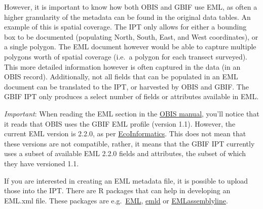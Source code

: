 \documentclass[
]{book}
\begin{document}
However, it is important to know how both OBIS and GBIF use EML, as often a higher granularity of the metadata can be found in the original data tables. An example of this is spatial coverage. The IPT only allows for either a bounding box to be documented (populating North, South, East, and West coordinates), or a single polygon. The EML document however would be able to capture multiple polygons worth of spatial coverage (i.e.~a polygon for each transect surveyed). This more detailed information however is often captured in the data (in an OBIS record). Additionally, not all fields that can be populated in an EML document can be translated to the IPT, or harvested by OBIS and GBIF. The GBIF IPT only produces a select number of fields or attributes available in EML.

\emph{Important}: When reading the EML section in the \href{https://obis.org/manual/eml/}{OBIS manual}, you'll notice that it reads that OBIS uses the GBIF EML profile (version 1.1). However, the current EML version is 2.2.0, as per \href{https://eml.ecoinformatics.org/}{EcoInformatics}. This does not mean that these versions are not compatible, rather, it means that the GBIF IPT currently uses a subset of available EML 2.2.0 fields and attributes, the subset of which they have versioned 1.1.

If you are interested in creating an EML metadata file, it is possible to upload those into the IPT. There are R packages that can help in developing an EML.xml file. These packages are e.g.~\href{https://github.com/ropensci/EML}{EML}, \href{https://github.com/ropensci/emld}{emld} or \href{https://ediorg.github.io/EMLassemblyline/articles/overview.html}{EMLassemblyline}.
\end{document}
